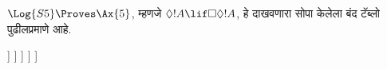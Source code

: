 \documentclass[../../../include/open-logic-section]{subfiles}
\begin{document}
\begin{ex}
  $\Log{S5} \Proves \Ax{5}$, म्हणजे
  $\Diamond!A \lif \Box\Diamond!A$, हे दाखवणारा
  सोपा केलेला बंद टॅब्लो पुढीलप्रमाणे आहे.
  \begin{oltableau}
    [\pFmla{\False}{\Diamond\formula{A} \lif \Box\Diamond \formula{A}}{1},
      just = \TAss
      [\pFmla{\True}{\Diamond \formula{A}}{1}, just = {\TRule{\False}{\lif}[1]}
        [\pFmla{\False}{\Box\Diamond \formula{A}}{1},
          just = {\TRule{\False}{\lif}[1]}
          [\pFmla{\False}{\Diamond \formula{A}}{2},
            just = {\TRule{\False}{\Box}[3]}
            [\pFmla{\True}{\formula{A}}{3},
              just = {\TRule{\True}{\Diamond}[2]}
                [\pFmla{\False}{\formula{A}}{3},
                  just = {\TRule{\False}{\Diamond}[4]}, close]
            ]
          ]
        ]
      ]
    ]
  \end{oltableau}
\end{ex}
\end{document}
